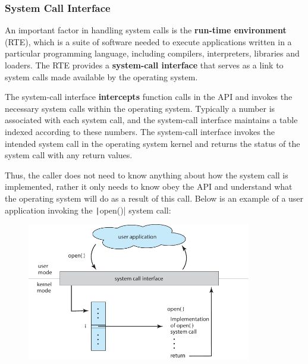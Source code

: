\documentclass{article}
\begin{document}
\subsubsection{System Call Interface}
An important factor in handling system calls is the \textbf{run-time environment} (RTE),
which is a suite of software needed to execute applications written in a particular programming language,
including compilers, interpreters, libraries and loaders. The RTE provides a \textbf{system-call interface}
that serves as a link to system calls made available by the operating system.

The system-call interface \textbf{intercepts} function calls in the API and invokes the necessary system calls
within the operating system. Typically a number is associated with each system call, and the system-call interface
maintains a table indexed according to these numbers. The system-call interface invokes the intended system call
in the operating system kernel and returns the status of the system call with any return values.

Thus, the caller does not need to know anything about how the system call is implemented, rather it only needs to
know obey the API and understand what the operating system will do as a result of this call. Below is an example
of a user application invoking the \texttt|open()| system call:
\begin{figure}[H]
    \centering
    \includegraphics[height = 6cm]{figures/system_call_open.pdf}
\end{figure}
\end{document}
